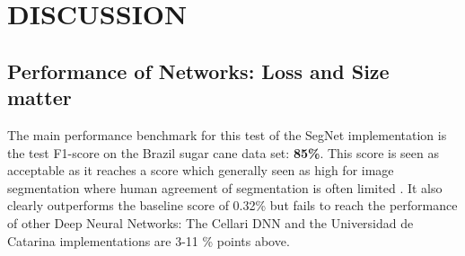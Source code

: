 \documentclass{article}
\begin{document}

%

%







%



\section{DISCUSSION}

\subsection{Performance of Networks: Loss and Size matter}
The main performance benchmark for this test of the SegNet implementation is the test F1-score on the Brazil sugar cane data set: \textbf{85\%}. This score is seen as acceptable as it reaches a score which generally seen as high for image segmentation where human agreement of segmentation is often limited \cite{eval}.  It also clearly outperforms the baseline score of 0.32\% but fails to reach the performance of other Deep Neural Networks: The Cellari DNN and the Universidad de Catarina implementations are 3-11 \% points above. 
\end{document}
